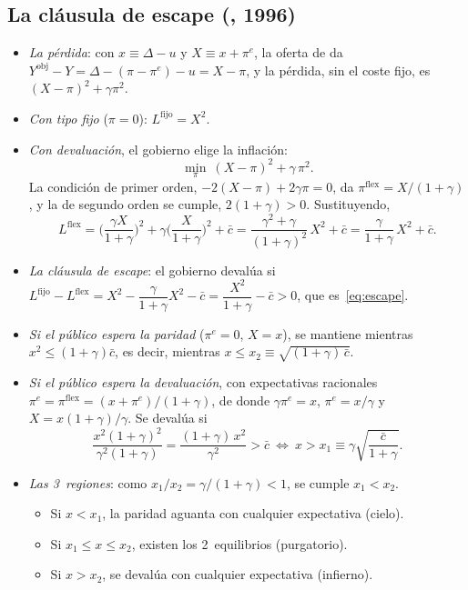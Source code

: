 \documentclass[11pt]{article}
\begin{document}
\subsection{La cláusula de escape (, 1996)}\label{anexo:clausula-escape}

\begin{itemize}
\item \emph{La pérdida}: con $x\equiv\Delta-u$ y $X\equiv x+\pi^e$, la oferta de  da $Y^{\mathrm{obj}}-Y=\Delta-(\pi-\pi^e)-u=X-\pi$, y la pérdida, sin el coste fijo, es $(X-\pi)^2+\gamma\pi^2$.
\item \emph{Con tipo fijo} ($\pi=0$): $L^{\mathrm{fijo}}=X^2$.
\item \emph{Con devaluación}, el gobierno elige la inflación:
  \[
  \min_{\pi}\ (X-\pi)^2+\gamma\,\pi^2 .
  \]
  La condición de primer orden, $-2(X-\pi)+2\gamma\pi=0$, da $\pi^{\mathrm{flex}}=X/(1+\gamma)$, y la de segundo orden se cumple, $2(1+\gamma)>0$. Sustituyendo,
  \[
  L^{\mathrm{flex}}=\Big(\frac{\gamma X}{1+\gamma}\Big)^2+\gamma\Big(\frac{X}{1+\gamma}\Big)^2+\bar c=\frac{\gamma^2+\gamma}{(1+\gamma)^2}\,X^2+\bar c=\frac{\gamma}{1+\gamma}\,X^2+\bar c .
  \]
\item \emph{La cláusula de escape}: el gobierno devalúa si $L^{\mathrm{fijo}}-L^{\mathrm{flex}}=X^2-\dfrac{\gamma}{1+\gamma}X^2-\bar c=\dfrac{X^2}{1+\gamma}-\bar c>0$, que es~\eqref{eq:escape}.
\item \emph{Si el público espera la paridad} ($\pi^e=0$, $X=x$), se mantiene mientras $x^2\le(1+\gamma)\bar c$, es decir, mientras $x\le x_2\equiv\sqrt{(1+\gamma)\,\bar c}$.
\item \emph{Si el público espera la devaluación}, con expectativas racionales $\pi^e=\pi^{\mathrm{flex}}=(x+\pi^e)/(1+\gamma)$, de donde $\gamma\pi^e=x$, $\pi^e=x/\gamma$ y $X=x(1+\gamma)/\gamma$. Se devalúa si
  \[
  \frac{x^2(1+\gamma)^2}{\gamma^2(1+\gamma)}=\frac{(1+\gamma)\,x^2}{\gamma^2}>\bar c\ \Longleftrightarrow\ x>x_1\equiv\gamma\sqrt{\frac{\bar c}{1+\gamma}} .
  \]
\item \emph{Las 3~regiones}: como $x_1/x_2=\gamma/(1+\gamma)<1$, se cumple $x_1<x_2$.
  \begin{itemize}
  \item Si $x<x_1$, la paridad aguanta con cualquier expectativa (cielo).
  \item Si $x_1\le x\le x_2$, existen los 2~equilibrios (purgatorio).
  \item Si $x>x_2$, se devalúa con cualquier expectativa (infierno). \findemo
  \end{itemize}
\end{itemize}
\end{document}
